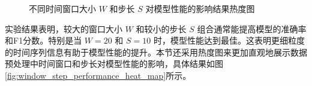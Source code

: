 \begin{figure}[htbp]
    \ContinuedFloat
	\centering
    \caption{不同时间窗口大小 $W$ 和步长 $S$ 对模型性能的影响结果热度图}
    \label{fig:window_step_performance_heat_map}
\end{figure}

实验结果表明，较大的窗口大小 \( W \) 和较小的步长 \( S \) 组合通常能提高模型的准确率和F1分数。特别是当 \( W = 20 \) 和 \( S = 10 \) 时，模型性能达到最佳。这表明更细粒度的时间序列信息有助于模型性能的提升。本节还采用热度图来更加直观地展示数据预处理中时间窗口和步长对模型性能的影响，具体结果如图\eqref{fig:window_step_performance_heat_map}所示。




